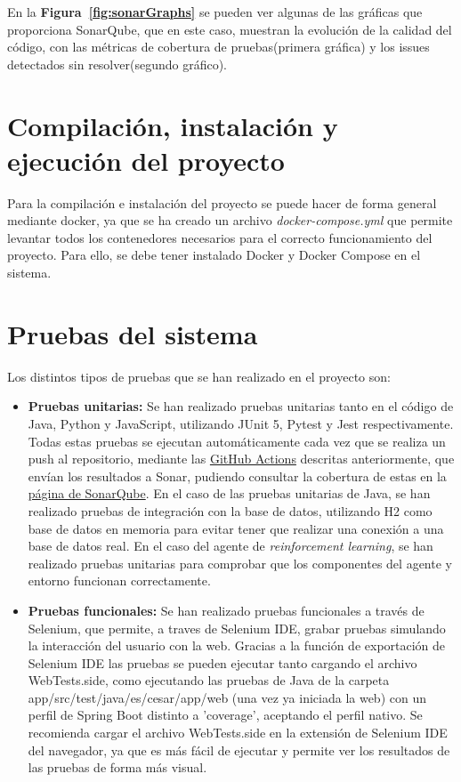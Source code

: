 En la \textbf{Figura~\ref{fig:sonarGraphs}} se pueden ver algunas de las gráficas que proporciona SonarQube, que en este caso, muestran la evolución de la calidad del código, con las métricas de cobertura de pruebas(primera gráfica) y los issues detectados sin resolver(segundo gráfico). 

\section{Compilación, instalación y ejecución del proyecto}
\label{sec:compilacion}
Para la compilación e instalación del proyecto se puede hacer de forma general mediante docker, ya que se ha creado un archivo \textit{docker-compose.yml} que permite levantar todos los contenedores necesarios para el correcto funcionamiento del proyecto. Para ello, se debe tener instalado Docker y Docker Compose en el sistema.

\section{Pruebas del sistema}
\label{sec:pruebas}

Los distintos tipos de pruebas que se han realizado en el proyecto son:
\begin{itemize}
    \item \textbf{Pruebas unitarias:} Se han realizado pruebas unitarias tanto  en el código de Java, Python y JavaScript, utilizando JUnit 5, Pytest y Jest respectivamente. Todas estas pruebas se ejecutan automáticamente cada vez que se realiza un push al repositorio, mediante las \hyperref[subsec:acciones]{GitHub Actions} descritas anteriormente, que envían los resultados a Sonar, pudiendo consultar la cobertura de estas en la \hyperref[subsec:sonarqube]{página de SonarQube}. 
    En el caso de las pruebas unitarias de Java, se han realizado pruebas de integración con la base de datos, utilizando H2 como base de datos en memoria para evitar tener que realizar una conexión a una base de datos real. En el caso del agente de \textit{reinforcement learning}, se han realizado pruebas unitarias para comprobar que los componentes del agente y entorno funcionan correctamente.
    \item \textbf{Pruebas funcionales:} Se han realizado pruebas funcionales a través de Selenium, que permite, a traves de Selenium IDE, grabar pruebas simulando la interacción del usuario con la web. Gracias a la función de exportación de Selenium IDE las pruebas se pueden ejecutar tanto cargando el archivo WebTests.side, como ejecutando las pruebas de Java de la carpeta app/src/test/java/es/cesar/app/web (una vez ya iniciada la web) con un perfil de Spring Boot distinto a 'coverage', aceptando el perfil nativo. Se recomienda cargar el archivo WebTests.side en la extensión de Selenium IDE del navegador, ya que es más fácil de ejecutar y permite ver los resultados de las pruebas de forma más visual.
\end{itemize}

